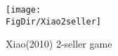 \begin{figure}[ht]
	\centerline{
		\texttt{[image: \\FigDir/Xiao2seller]}
	}
	\caption{Xiao(2010) 2-seller game} \label{fig:Xiao2seller}
\end{figure}